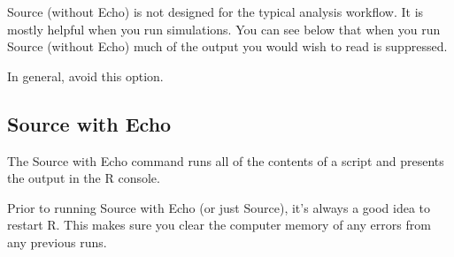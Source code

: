\documentclass[
]{krantz}
\makeatletter
\newenvironment{Shaded}{\begin{snugshade}}{\end{snugshade}}
\newcommand{\DataTypeTok}[1]{\textcolor[rgb]{0.27,0.27,0.27}{#1}}
\newcommand{\DecValTok}[1]{\textcolor[rgb]{0.06,0.06,0.06}{#1}}
\newcommand{\KeywordTok}[1]{\textcolor[rgb]{0.27,0.27,0.27}{\textbf{#1}}}
\newcommand{\NormalTok}[1]{#1}
\newcommand{\OperatorTok}[1]{\textcolor[rgb]{0.43,0.43,0.43}{\textbf{#1}}}
\newcommand{\StringTok}[1]{\textcolor[rgb]{0.5,0.5,0.5}{#1}}
\newenvironment{kframe}{%
\medskip{}
\setlength{\fboxsep}{.8em}
 \def\at@end@of@kframe{}%
 \ifinner\ifhmode%
  \def\at@end@of@kframe{\end{minipage}}%
  \begin{minipage}{\columnwidth}%
 \fi\fi%
 \def\FrameCommand##1{\hskip\@totalleftmargin \hskip-\fboxsep
 \colorbox{shadecolor}{##1}\hskip-\fboxsep
     \hskip-\linewidth \hskip-\@totalleftmargin \hskip\columnwidth}%
 \MakeFramed {\advance\hsize-\width
   \@totalleftmargin\z@ \linewidth\hsize
   \@setminipage}}%
 {\par\unskip\endMakeFramed%
 \at@end@of@kframe}
\renewenvironment{Shaded}{\begin{kframe}}{\end{kframe}}
\makeatother
\begin{document}
Source (without Echo) is not designed for the typical analysis workflow. It is mostly helpful when you run simulations. You can see below that when you run Source (without Echo) much of the output you would wish to read is suppressed.

In general, avoid this option.

\begin{Shaded}
\end{Shaded}

\hypertarget{source-with-echo}{%
\subsection{Source with Echo}\label{source-with-echo}}

The Source with Echo command runs all of the contents of a script and presents the output in the R console.

Prior to running Source with Echo (or just Source), it's always a good idea to restart R. This makes sure you clear the computer memory of any errors from any previous runs.
\end{document}
